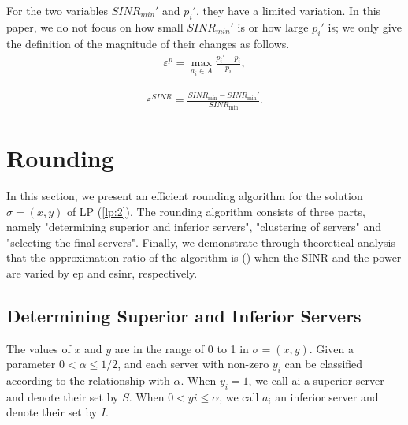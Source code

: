 \documentclass[11pt,a4paper]{article}
\begin{document}
For the two variables $SINR_{min}'$ and $p_i'$, they have a limited variation. In this paper, we do not focus on how small $SINR_{min}'$ is or how large $p_i'$ is; we only give the definition of the magnitude of their changes as follows.
\begin{eqnarray}
	{\varepsilon ^p} = \mathop {\max }\limits_{{a_i} \in A} \frac{{{p_i}' - {p_i}}}{{{p_i}}},
\end{eqnarray}


\begin{eqnarray}
	{\varepsilon ^{SINR}} = \frac{{SIN{R_{\min }} - SIN{R_{\min }}'}}{{SIN{R_{\min }}}}.
\end{eqnarray}



\section{Rounding}
In this section, we present an efficient rounding algorithm for the solution $\sigma=(x,y)$ of LP (\ref{lp:2}). The rounding algorithm consists of three parts, namely "determining superior and inferior servers", "clustering of servers" and "selecting the final servers". Finally, we demonstrate through theoretical analysis that the approximation ratio of the algorithm is () when the SINR and the power are varied by ep and esinr, respectively.

\subsection{Determining Superior and Inferior Servers}
The values of $x$ and $y$ are in the range of 0 to 1 in $\sigma=(x,y)$. Given a parameter $0<\alpha\le1/2$, and each server with non-zero $y_i$ can be classified according to the relationship with $\alpha$. When $y_i=1$, we call ai a superior server and denote their set by $S$. When $0< yi\le \alpha$, we call $a_i$ an inferior server and denote their set by $I$.
\end{document}
